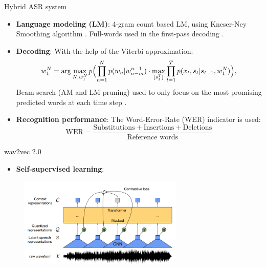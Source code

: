 \begin{frame}{Hybrid ASR system \cite{RASR-hybrid_vs_attention}}
\begin{itemize}
    \item \textbf{Language modeling (LM)}: 4-gram count based LM, using Kneser-Ney Smoothing algorithm \cite{kneser_ney_lm}. 
    Full-words used in the first-pass decoding \cite{beck2019lstm}. 
    
    \item \textbf{Decoding}: With the help of the Viterbi approximation:
    \begin{align}
    	w_1^N = \operatorname{arg}\max_{N,w_1^N}p\Bigl(\prod_{n=1}^Np(w_n|w_{n-m}^{n-1}) \cdot
    	\max_{[s_1^T]}\prod_{t=1}^Tp(x_t,s_t|s_{t-1}, w_1^N)\Bigr),
    \end{align}
    Beam search (AM and LM pruning) used to only focus on the most promising predicted words at each time step \cite{ortmanns1997word}.
    
    \item \textbf{Recognition performance}: The Word-Error-Rate (WER) indicator is used:
    \begin{equation}
        \text{WER} = \frac{\text{Substitutions} + \text{Insertions} + \text{Deletions}}{\text{Reference words}}
    \end{equation}

\end{itemize}
\end{frame}


\begin{frame}{wav2vec 2.0 \cite{facebookwav2vec2}}

\newcommand{\cSeq}{$\mathbf{c}_1^{T_{w2v}}$}
\newcommand{\qSeq}{$\mathbf{c}_1^{T_{w2v}}$}

\begin{itemize}
    \item \textbf{Self-supervised learning}:
\end{itemize}

\begin{figure}[hbtp]
    \centering
    \includegraphics[width=0.7\textwidth]{figures/speech_representation_wav2vec2.PNG}
    \caption{}
    \label{speech_representation_wav2vec2}
    \end{figure}
    
\end{frame}


